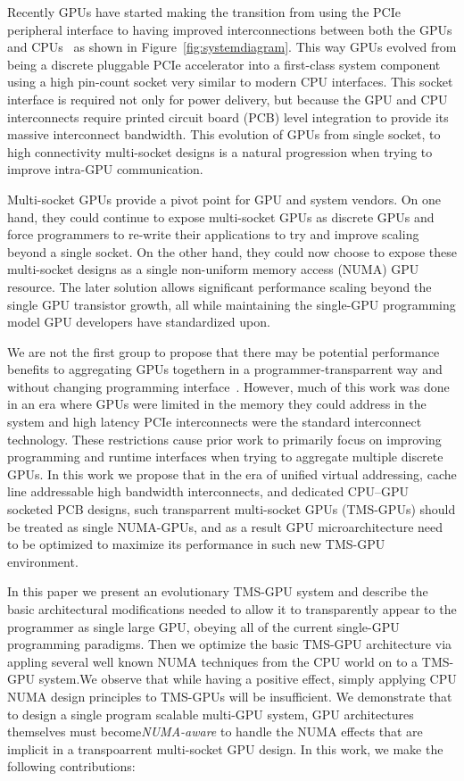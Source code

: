 Recently GPUs have started making the transition from using the PCIe peripheral
interface to having improved interconnections between both the GPUs and
CPUs~\cite{dgx,AMDINFINITYFABRIC} as shown in Figure~\ref{fig:systemdiagram}.
This way GPUs evolved from being a discrete pluggable PCIe accelerator into a
first-class system component using a high pin-count socket very similar to
modern CPU interfaces. This socket interface is required not only for power
delivery, but because the GPU and CPU interconnects require printed circuit
board (PCB) level integration to provide its massive interconnect bandwidth.
This evolution of GPUs from single socket, to high connectivity multi-socket
designs is a natural progression when trying to improve intra-GPU
communication.

Multi-socket GPUs provide a pivot point for GPU and system vendors. On one hand, they
could continue to expose multi-socket GPUs as discrete GPUs and force programmers
to re-write their applications to try and improve scaling beyond a single socket.
On the other hand, they could now choose to expose these multi-socket designs as
a single non-uniform memory access (NUMA) GPU resource. The later solution allows 
significant performance scaling beyond the single GPU transistor growth, all
while maintaining the single-GPU programming model GPU developers have standardized upon.

We are not the first group to propose that there may be potential performance
benefits to aggregating GPUs togethern in a programmer-transparrent way and without changing programming
interface~\cite{Cabezas2015,lee2013transparent}. However, much of this work was
done in an era where GPUs were limited in the memory they could address in the
system and high latency PCIe interconnects were the standard interconnect
technology. These restrictions cause prior work to primarily focus on improving
programming and runtime interfaces when trying to aggregate multiple discrete
GPUs. In this work we propose that in the era of unified virtual addressing,
cache line addressable high bandwidth interconnects, and dedicated CPU--GPU
socketed PCB designs, such transparrent multi-socket GPUs (TMS-GPUs) should 
be treated as single NUMA-GPUs, and as a result GPU microarchitecture need to be optimized
 to maximize its performance in such new TMS-GPU environment.

In this paper we present an evolutionary TMS-GPU system and describe the
basic architectural modifications needed to allow it to transparently appear to
the programmer as single large GPU, obeying all of the current single-GPU
programming paradigms. Then we optimize the basic TMS-GPU architecture via
appling several well known NUMA techniques from the CPU world on to a TMS-GPU
system.We observe that while having a positive effect, simply applying CPU
NUMA design principles to TMS-GPUs will be insufficient. We demonstrate that
to design a single program scalable multi-GPU system, GPU architectures
themselves must become\textit{NUMA-aware} to handle the NUMA effects that are
implicit in a transpoarrent multi-socket GPU design. In this work, we make the following
contributions:

